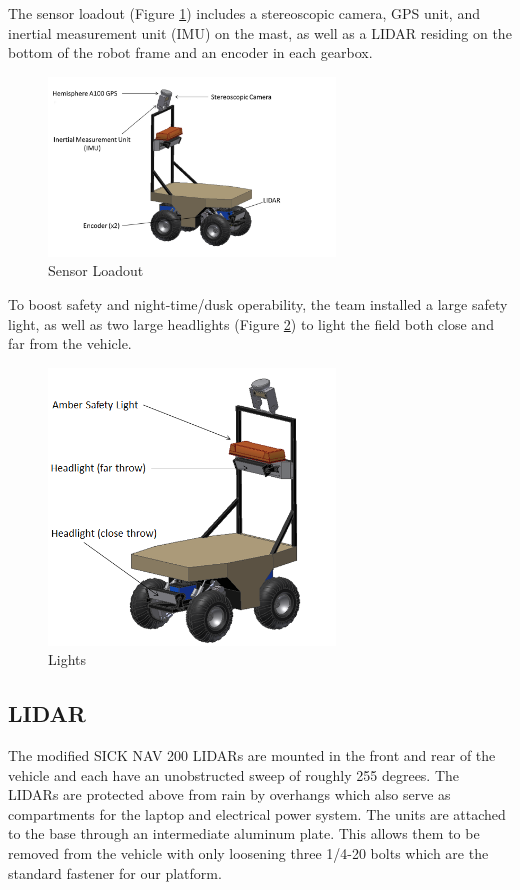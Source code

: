 The sensor loadout (Figure \ref{FIG:sensors}) includes a stereoscopic camera, GPS unit, and inertial measurement unit (IMU) on the mast, as well as a LIDAR residing on the bottom of the robot frame and an encoder in each gearbox.

\begin{figure}[H]
\begin{center}
\includegraphics[width=3in]{./Pics/Sensors.png}
\caption{Sensor Loadout}
\label{FIG:sensors}
\end{center}
\end{figure}

To boost safety and night-time/dusk operability, the team installed a large safety light, as well as two large headlights (Figure \ref{FIG:lights}) to light the field both close and far from the vehicle.

\begin{figure}[H]
\begin{center}
\includegraphics[width=3in]{./Pics/Lighting.png}
\caption{Lights}
\label{FIG:lights}
\end{center}
\end{figure}


\subsection{LIDAR}
The modified SICK NAV 200 LIDARs are mounted in the front and rear of the vehicle and each have an unobstructed sweep of roughly 255 degrees. The LIDARs are protected above from rain by overhangs which also serve as compartments for the laptop and electrical power system. The units are attached to the base through an intermediate aluminum plate. This allows them to be removed from the vehicle with only loosening three 1/4-20 bolts which are the standard fastener for our platform.
